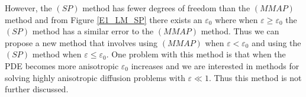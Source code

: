 \documentclass[12pt]{ociamthesis}
\begin{document}
However, the $(SP)$ method has fewer degrees of freedom than the $(MMAP)$ method and from Figure \ref{E1_LM_SP} there exists an $\varepsilon_0$ where when $\varepsilon \geq \varepsilon_0$ the $(SP)$ method has a similar error to the $(MMAP)$ method. Thus we can propose a new method that involves using $(MMAP)$ when $\varepsilon < \varepsilon_0$ and using the $(SP)$ method when $\varepsilon \leq \varepsilon_0$. One problem with this method is that when the PDE becomes more anisotropic $\varepsilon_0$ increases and we are interested in methods for solving highly anisotropic diffusion problems with $\varepsilon \ll 1$. Thus this method is not further discussed.

\begin{table}[H]
\end{table}
\end{document}
